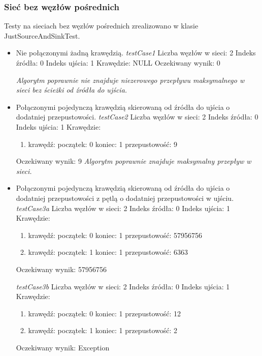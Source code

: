 \subsubsection{Sieć bez węzłów pośrednich}
Testy na sieciach bez węzłów pośrednich zrealizowano w klasie JustSourceAndSinkTest.
\begin{itemize}[nosep]
    \item Nie połączonymi żadną krawędzią.
    \emph{testCase1}
    Liczba węzłów w sieci: 2
    Indeks źródła: 0
    Indeks ujścia: 1
    Krawędzie: NULL
    Oczekiwany wynik: 0

    \emph{Algorytm poprawnie nie znajduje niezerowego
    przepływu maksymalnego w sieci bez ścieżki od źródła do ujścia.}

    \item Połączonymi pojedynczą krawędzią skierowaną od źródła do ujścia o dodatniej przepustowości.
    \emph{testCase2}
    Liczba węzłów w sieci: 2
    Indeks źródła: 0
    Indeks ujścia: 1
    Krawędzie:
    \begin{enumerate}[nosep]
        \item krawędź:
        początek: 0
        koniec: 1
        przepustowość: 9
    \end{enumerate}
    Oczekiwany wynik: 9
    \emph{Algorytm poprawnie znajduje maksymalny przepływ w sieci.}

    \item Połączonymi pojedynczą krawędzią skierowaną od źródła do ujścia o dodatniej przepustowości z pętlą o dodatniej przepustowości w ujściu.
    \emph{testCase3a}
    Liczba węzłów w sieci: 2
    Indeks źródła: 0
    Indeks ujścia: 1
    Krawędzie:
    \begin{enumerate}[nosep]
        \item krawędź:
        początek: 0
        koniec: 1
        przepustowość: 57956756
        \item krawędź:
        początek: 1
        koniec: 1
        przepustowość: 6363
    \end{enumerate}
    Oczekiwany wynik: 57956756

    \emph{testCase3b}
    Liczba węzłów w sieci: 2
    Indeks źródła: 0
    Indeks ujścia: 1
    Krawędzie:
    \begin{enumerate}[nosep]
        \item krawędź:
        początek: 0
        koniec: 1
        przepustowość: 12
        \item krawędź:
        początek: 1
        koniec: 1
        przepustowość: 2
    \end{enumerate}
    Oczekiwany wynik: Exception


\end{itemize}
